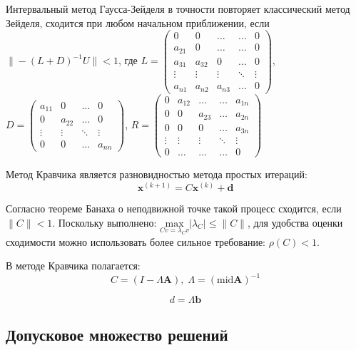 Интервальный метод Гаусса-Зейделя в точности повторяет классический метод Зейделя, сходится при любом начальном приближении, если $\| -(L + D) ^ {-1}U \| < 1$, где 
$L=
\begin{pmatrix}
0 & 0 & \dots & \dots & 0 \\
a_{21} & 0 & \dots & \dots & 0 \\
a_{31} & a_{32} & 0 & \dots & 0 \\
\vdots & \vdots & \vdots & \ddots & \vdots \\
a_{n1} & a_{n2} & a_{n3} & \dots & 0
\end{pmatrix}
$, 
$D=
\begin{pmatrix}
a_{11} & 0 & \dots & 0 \\
0 & a_{22} & \dots & 0 \\
\vdots & \vdots & \ddots & \vdots \\
0 & 0 & \dots & a_{nn}
\end{pmatrix}
$,
$R =
\begin{pmatrix}
0 & a_{12} & \dots & \dots & a_{1n} \\
0 & 0 & a_{23} & \dots & a_{2n} \\
0 & 0 & 0 & \dots & a_{3n} \\
\vdots & \vdots & \vdots & \ddots & \vdots \\
0 & \dots & \dots & \dots & 0
\end{pmatrix}
$

Метод Кравчика является разновидностью метода простых итераций:
\begin{equation}
\mathbf{x}^{(k+1)} = C\mathbf{x}^{(k)} + \mathbf{d}
\end{equation}

Согласно теореме Банаха о неподвижной точке такой процесс сходится, если $\|C\| < 1$. Поскольку выполнено: $\underset{Cv = \lambda_C v }{\textrm{max}} |\lambda_C| \leq \|C\|$, для удобства оценки сходимости можно использовать более сильное требование: $\rho(C) < 1$.

В методе Кравчика полагается:
\begin{equation}
C=(I - \Lambda \mathbf{A}), \; \Lambda = (\textrm{mid} \mathbf{A}) ^ {-1}
\end{equation}

\begin{equation}
d=\Lambda \mathbf{b}
\end{equation}

\subsection{Допусковое множество решений}

